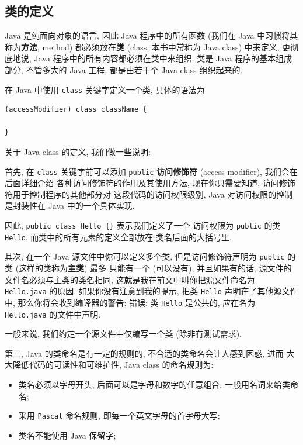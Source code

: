 \documentclass[10pt,UTF8]{book} %
\begin{document}
\subsection{类的定义}

Java 是纯面向对象的语言, 因此 Java 程序中的所有函数 
(我们在 Java 中习惯将其称为\textbf{方法}, method) 都必须放在\textbf{类} (class,
本书中常称为 Java class) 中来定义,
更彻底地说, Java 程序中的所有内容都必须在类中来组织.
类是 Java 程序的基本组成部分, 不管多大的 Java 工程, 都是由若干个 Java class 组织起来的.

在 Java 中使用 \lstinline|class|
关键字定义一个类, 具体的语法为
\begin{lstlisting}
(accessModifier) class className {

}
\end{lstlisting}
关于 Java class 的定义, 我们做一些说明:

首先, 在 \lstinline|class| 关键字前可以添加 
\lstinline|public| \textbf{访问修饰符} (access modifier), 我们会在后面详细介绍
各种访问修饰符的作用及其使用方法, 现在你只需要知道, 访问修饰符用于控制程序的其他部分对
这段代码的访问权限级别, Java 对访问权限的控制是封装性在 Java 中的一个具体实现.

因此, \lstinline|public class Hello {}| 表示我们定义了一个
访问权限为 \lstinline|public| 的类 \lstinline|Hello|, 而类中的所有元素的定义全部放在
类名后面的大括号里.

其次, 在一个 Java 源文件中你可以定义多个类, 
但是访问修饰符声明为 \lstinline|public| 的类 (这样的类称为\textbf{主类}) 最多
只能有一个 (可以没有), 并且如果有的话, 源文件的文件名必须与主类的类名相同, 
这就是我在前文中叫你把源文件命名为 \lstinline|Hello.java| 的原因.
如果你没有注意到我的提示,
把类 \lstinline|Hello| 声明在了其他源文件中, 那么你将会收到编译器的警告:
\kaishu 错误: 类 \lstinline|Hello| 是公共的,
应在名为 \lstinline|Hello.java| 的文件中声明. \songti

一般来说, 我们约定一个源文件中仅编写一个类 (除非有测试需求).

第三, Java 的类命名是有一定的规则的, 不合适的类命名会让人感到困惑, 进而
大大降低代码的可读性和可维护性, Java class 的命名规则为:
\begin{itemize}[itemsep = 0pt]
    \item 类名必须以字母开头, 后面可以是字母和数字的任意组合, 一般用名词来给类命名;
    \item 采用 \lstinline|Pascal| 命名规则, 即每一个英文字母的首字母大写;
    \item 类名不能使用 Java 保留字;
\end{itemize}
\end{document}

